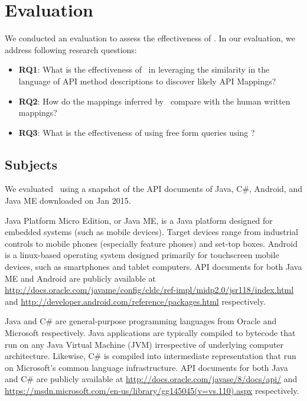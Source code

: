\section{Evaluation}
\label{sec:evaluation}

We conducted an evaluation to assess the effectiveness of \tool. In our evaluation, we address following research questions:

\begin{itemize}
	
\item\textbf{RQ1}: What is the effectiveness of \tool\ in leveraging the similarity in the language of API method descriptions to discover likely API Mappings?

\item\textbf{RQ2}: How do the mappings inferred by \tool\ compare with the human written mappings?

\item\textbf{RQ3}: What is the effectiveness of using free form queries using \tool?

\end{itemize}

\subsection{Subjects}
\label{sub:subject}


We evaluated \tool\ using a snapshot of the API documents of Java, C\#, Android, and Java ME downloaded on Jan 2015. 

Java Platform Micro Edition, or Java ME, is a Java platform designed for embedded systems (such as mobile devices). Target devices range from industrial controls to mobile phones (especially feature phones) and set-top boxes.
Android is a linux-based operating system designed primarily for touchscreen mobile devices, such as smartphones and tablet computers.
API documents for both Java ME and Android are publicly available at
\url{http://docs.oracle.com/javame/config/cldc/ref-impl/midp2.0/jsr118/index.html}
and 
\url{http://developer.android.com/reference/packages.html}
respectively.

Java and C\# are general-purpose programming languages from Oracle and Microsoft respectively. Java applications are typically compiled to bytecode that run on any Java Virtual Machine (JVM) irrespective of underlying computer architecture.
Likewise, C\# is compiled into intermediate representation that run on Microsoft's common language infrastructure. API documents for both Java and C\# are publicly available at
\url{http://docs.oracle.com/javase/8/docs/api/}
and
\url{https://msdn.microsoft.com/en-us/library/gg145045(v=vs.110).aspx}
respectively.


